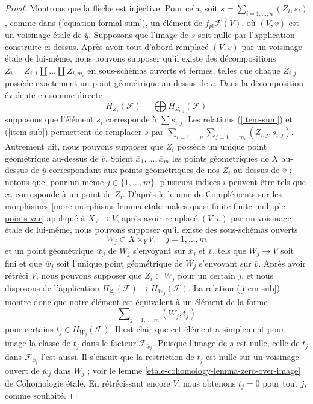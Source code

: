 \begin{proof}
\medskip\noindent
Montrons que la flèche est injective. Pour cela, soit
$s = \sum_{i = 1, \ldots, n} (Z_i, s_i)$, comme dans (\ref{equation-formal-sum}),
un élément de $f_{p!}\mathcal{F}(V)$, où $(V, \overline{v})$ est un
voisinage étale de $\overline{y}$. Supposons que l'image de $s$ soit nulle
par l'application construite ci-dessus. Après avoir tout d'abord remplacé
$(V, \overline{v})$ par un voisinage étale de lui-même,
nous pouvons supposer qu'il existe des décompositions
$Z_i = Z_{i, 1} \amalg \ldots \amalg Z_{i, m_i}$ en sous-schémas
ouverts et fermés, telles que chaque $Z_{i, j}$ possède exactement un point géométrique
au-dessus de $\overline{v}$. Dans la décomposition évidente en somme directe
$$
H_{Z_i}(\mathcal{F}) = \bigoplus H_{Z_{i, j}}(\mathcal{F})
$$
supposons que l'élément $s_i$ corresponde à $\sum s_{i, j}$. Les relations
(\ref{item-sum}) et (\ref{item-sub}) permettent de remplacer $s$ par
$\sum_{i = 1, \ldots, n} \sum_{j = 1, \ldots, m_i} (Z_{i, j}, s_{i, j})$.
Autrement dit, nous pouvons supposer que $Z_i$ possède un unique point géométrique
au-dessus de $\overline{v}$. Soient $\overline{x}_1, \ldots, \overline{x}_m$
les points géométriques de $X$ au-dessus de $\overline{y}$ correspondant aux
points géométriques de nos $Z_i$ au-dessus de $\overline{v}$ ; notons que, pour
un même $j \in \{1, \ldots, m\}$, plusieurs indices $i$ peuvent être tels que
$\overline{x}_j$ corresponde à un point de $Z_i$.
D'après le lemme de Compléments sur les morphismes
\ref{more-morphisms-lemma-etale-makes-quasi-finite-finite-multiple-points-var}
appliqué à $X_V \to V$, après avoir remplacé
$(V, \overline{v})$ par un voisinage étale de lui-même,
nous pouvons supposer qu'il existe des sous-schémas ouverts
$$
W_j \subset X \times_Y V,\quad j = 1, \ldots, m
$$
et un point géométrique $\overline{w}_j$ de $W_j$ s'envoyant sur $\overline{x}_j$ et
$\overline{v}$, tels que $W_j \to V$ soit fini et que $\overline{w}_j$ soit l'unique
point géométrique de $W_j$ s'envoyant sur $\overline{v}$.
Après avoir rétréci $V$, nous pouvons supposer que $Z_i \subset W_j$ pour un certain $j$,
et nous disposons de l'application $H_{Z_i}(\mathcal{F}) \to H_{W_j}(\mathcal{F})$.
La relation (\ref{item-sub}) montre donc
que notre élément est équivalent à un élément de la forme
$$
\sum\nolimits_{j = 1, \ldots, m} (W_j, t_j)
$$
pour certains $t_j \in H_{W_j}(\mathcal{F})$. Il est clair que cet élément a
simplement pour image la classe de $t_j$ dans le facteur $\mathcal{F}_{\overline{x}_j}$.
Puisque l'image de $s$ est nulle, celle de $t_j$ dans
$\mathcal{F}_{\overline{x}_j}$ l'est aussi. Il s'ensuit que la restriction de $t_j$
est nulle sur un voisinage ouvert de $\overline{w}_j$ dans $W_j$ ; voir le
lemme \ref{etale-cohomology-lemma-zero-over-image} de Cohomologie étale.
En rétrécissant encore $V$, nous obtenons $t_j = 0$ pour tout $j$, comme souhaité.
\end{proof}

